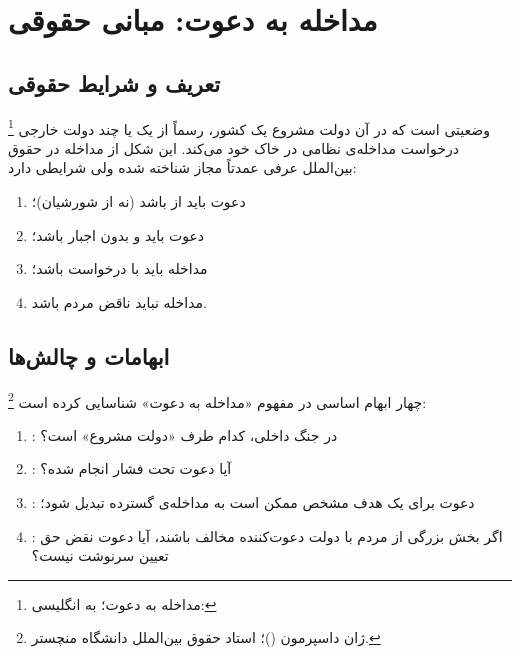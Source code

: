 \section{مداخله به دعوت: مبانی حقوقی}
\label{sec:ch03-invitation}

\subsection{تعریف و شرایط حقوقی}
\label{subsec:ch03-inv-def}

\begin{tcolorbox}[legalbox,
	title={مداخله به دعوت در حقوق بین‌الملل}]
	\footnote{مداخله به دعوت؛ به انگلیسی:
		}%
	وضعیتی است که در آن دولت مشروع یک کشور، رسماً از یک یا چند
	دولت خارجی درخواست مداخله‌ی نظامی در خاک خود می‌کند. این شکل
	از مداخله در حقوق بین‌الملل عرفی عمدتاً مجاز شناخته
	شده
	ولی شرایطی دارد:
	\begin{enumerate}[label=\textbf{\alph*.}, nosep, rightmargin=1em]
		\item دعوت باید از  باشد (نه از شورشیان)؛
		\item دعوت باید  و بدون اجبار باشد؛
		\item مداخله باید  با درخواست باشد؛
		\item مداخله نباید ناقض  مردم باشد.
	\end{enumerate}
\end{tcolorbox}

\subsection{ابهامات و چالش‌ها}
\label{subsec:ch03-inv-challenges}

%
\footnote{%
	ژان داسپرمون ()؛%
	استاد حقوق بین‌الملل دانشگاه منچستر.%
}%
چهار ابهام اساسی در مفهوم «مداخله به دعوت» شناسایی کرده
است:

\begin{enumerate}[label=\textbf{\arabic*.}, nosep, rightmargin=1em]
	\item {}: در جنگ داخلی، کدام
	طرف «دولت مشروع» است؟
	\item {}: آیا دعوت تحت فشار انجام
	شده؟
	\item {}: دعوت برای یک هدف مشخص ممکن
	است به مداخله‌ی گسترده تبدیل شود؛
	\item {}: اگر بخش بزرگی از مردم با
	دولت دعوت‌کننده مخالف باشند، آیا دعوت نقض حق تعیین سرنوشت
	نیست؟
\end{enumerate}

